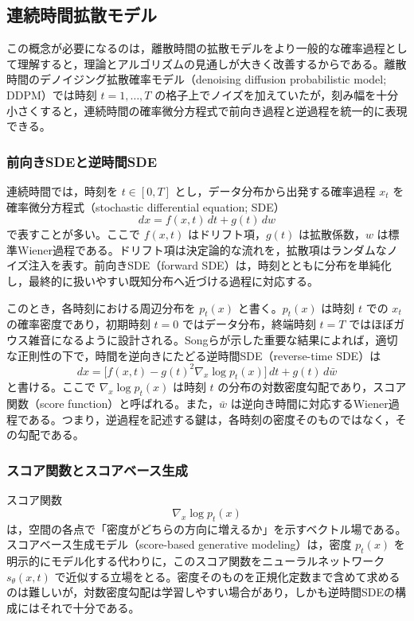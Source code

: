 \subsection{連続時間拡散モデル}

この概念が必要になるのは，離散時間の拡散モデルをより一般的な確率過程として理解すると，理論とアルゴリズムの見通しが大きく改善するからである。離散時間のデノイジング拡散確率モデル（denoising diffusion probabilistic model; DDPM）では時刻 \(t=1,\dots,T\) の格子上でノイズを加えていたが，刻み幅を十分小さくすると，連続時間の確率微分方程式で前向き過程と逆過程を統一的に表現できる。

\subsubsection{前向きSDEと逆時間SDE}

連続時間では，時刻を \(t \in [0,T]\) とし，データ分布から出発する確率過程 \(x_t\) を確率微分方程式（stochastic differential equation; SDE）
\[
dx = f(x,t)\,dt + g(t)\,d w
\]
で表すことが多い。ここで \(f(x,t)\) はドリフト項，\(g(t)\) は拡散係数，\(w\) は標準Wiener過程である。ドリフト項は決定論的な流れを，拡散項はランダムなノイズ注入を表す。前向きSDE（forward SDE）は，時刻とともに分布を単純化し，最終的に扱いやすい既知分布へ近づける過程に対応する。

このとき，各時刻における周辺分布を \(p_t(x)\) と書く。\(p_t(x)\) は時刻 \(t\) での \(x_t\) の確率密度であり，初期時刻 \(t=0\) ではデータ分布，終端時刻 \(t=T\) ではほぼガウス雑音になるように設計される。Songらが示した重要な結果によれば，適切な正則性の下で，時間を逆向きにたどる逆時間SDE（reverse-time SDE）は
\[
dx=
\bigl[f(x,t)-g(t)^2\nabla_x \log p_t(x)\bigr]\,dt
+ g(t)\,d\bar{w}
\]
と書ける。ここで \(\nabla_x \log p_t(x)\) は時刻 \(t\) の分布の対数密度勾配であり，スコア関数（score function）と呼ばれる。また，\(\bar{w}\) は逆向き時間に対応するWiener過程である。つまり，逆過程を記述する鍵は，各時刻の密度そのものではなく，その勾配である。

\subsubsection{スコア関数とスコアベース生成}

スコア関数
\[
\nabla_x \log p_t(x)
\]
は，空間の各点で「密度がどちらの方向に増えるか」を示すベクトル場である。スコアベース生成モデル（score-based generative modeling）は，密度 \(p_t(x)\) を明示的にモデル化する代わりに，このスコア関数をニューラルネットワーク \(s_{\theta}(x,t)\) で近似する立場をとる。密度そのものを正規化定数まで含めて求めるのは難しいが，対数密度勾配は学習しやすい場合があり，しかも逆時間SDEの構成にはそれで十分である。

